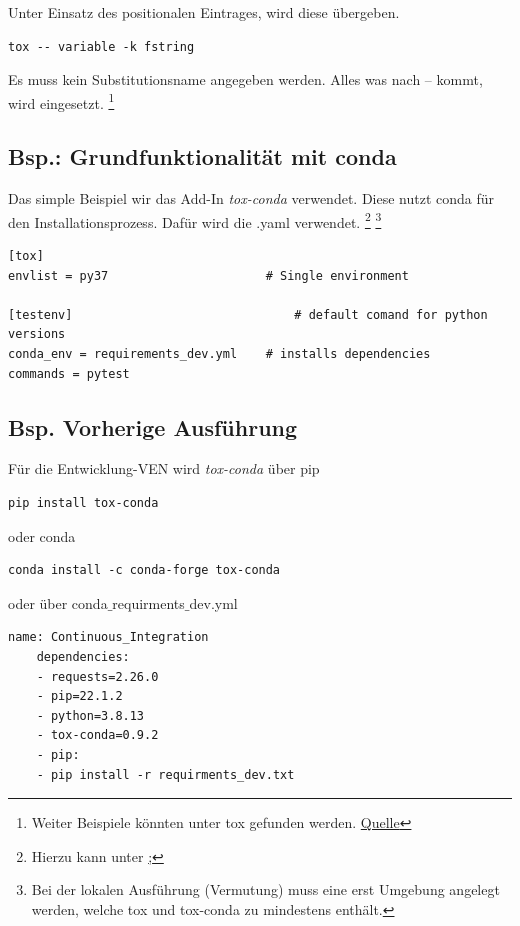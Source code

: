 Unter Einsatz des positionalen Eintrages, wird diese übergeben.
\begin{lstlisting}[style=CMD, caption={Nur fstrings tests werden ausgeführt}, captionpos=b]
tox -- variable -k fstring
\end{lstlisting}
Es muss kein Substitutionsname angegeben werden. Alles was nach -- kommt, wird eingesetzt. \footnote{
	Weiter Beispiele könnten unter tox gefunden werden. \href{https://tox.wiki/en/latest/example/pytest.html}{Quelle}
}

\subsection{Bsp.: Grundfunktionalität mit conda}
Das simple Beispiel wir das Add-In \textit{tox-conda} verwendet. Diese nutzt conda für den Installationsprozess. Dafür wird die \gls{.yaml} verwendet. \footnote{
	Hierzu kann unter \href{https://github.com/tox-dev/tox-conda/pull/48 mehr nachgelesen werden.}; 
}
\footnote{
	Bei der lokalen Ausführung (Vermutung) muss eine erst Umgebung angelegt werden, welche tox und tox-conda zu mindestens enthält.
}

\begin{lstlisting}[style=Config]
[tox]
envlist = py37						# Single environment

[testenv]								# default comand for python versions
conda_env = requirements_dev.yml	# installs dependencies
commands = pytest 
\end{lstlisting}


\subsection{Bsp. Vorherige Ausführung}
Für die Entwicklung-\gls{VEN} wird \textit{tox-conda} über pip 
\begin{lstlisting}[style=CMD]
pip install tox-conda
\end{lstlisting}
oder conda 
\begin{lstlisting}[style=CMD]
conda install -c conda-forge tox-conda
\end{lstlisting}
oder über conda$\_$requirments$\_$dev.yml
\begin{lstlisting}[style=Config, caption={Conda-Requirment-Dev für tox-conda}, captionpos=b]
	name: Continuous_Integration
	dependencies:
	- requests=2.26.0
	- pip=22.1.2
	- python=3.8.13
	- tox-conda=0.9.2
	- pip:
	- pip install -r requirments_dev.txt
\end{lstlisting}

